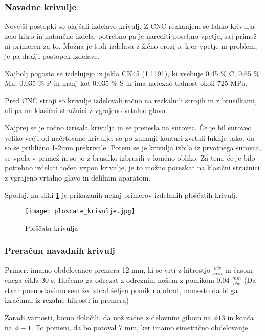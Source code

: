 \subsubsection{Navadne krivulje}
Novejši postopki so olajšali izdelavo krivulj. Z CNC rezkanjem se 
lahko krivulja zelo hitro in natančno izdela, potrebno pa je 
narediti posebno vpetje, saj primež ni primeren za to. Možna je 
tudi izdelava z žično erozijo, kjer vpetje ni problem, je pa dražji
postopek izdelave. 

Najbolj pogosto se izdelujejo iz jekla CK45 (1.1191), ki vsebuje 
0.45 \% C, 0.65 \% Mn, 0.035 \% P in manj kot 0.035 \% S in ima natezno trdnost okoli 725 MPa.

Pred CNC stroji so krivulje izdelovali ročno na rezkalnih strojih 
in z brusilkami, ali pa na klasični stružnici z vgrajeno vrtalno glavo. 

Najprej se je ročno izrisala krivulja in se prenesla na surovec. 
Če je bil surovec veliko večji od načrtovane krivulje, so po 
zunanji konturi zvrtali luknje tako, da so se približno 1-2mm 
prekrivale. Potem se je krivulja izbila iz prvotnega surovca, 
se vpela v primež in so jo z brusilko izbrusili v končno obliko. 
Za tem, če je bilo potrebno izdelati točen vzpon krivulje, je to 
možno porezkat na klasični stružnici z vgrajeno vrtalno glavo in 
delilnim aparatom. 

Spodaj, na sliki \ref{ploscate_krivulje} je prikazanih nekaj primerov
izdelanih ploščatih krivulj.

\begin{figure}[H]
    \begin{center}
        \texttt{[image: ploscate\_krivulje.jpg]}
        \caption{Ploščata krivulja
        \cite{lasten}}   
        \label{ploscate_krivulje}
    \end{center}
\end{figure}
\newpage
\subsubsection{Preračun navadnih krivulj}
\label{izracun_krivulj}
Primer: imamo obdelovanec premera 12 mm, ki se vrti z hitrostjo \( \frac{obr}{min} \)
in časom enega cikla 30 s. Hočemo ga odrezat z odreznim nožem z pomikom 0.04 \( \frac{mm}{obr} \)
(Da stvar poenostavimo sem že izbral željen pomik na obrat, namesto da bi ga 
izračunal iz rezalne hitrosti in premera)

Zaradi varnosti, bomo določili, da nož začne z delovnim gibom 
na $\phi13$ in konča na $\phi-1$. To pomeni, da bo potoval 7 mm, ker 
imamo simetrično obdelovanje. 

